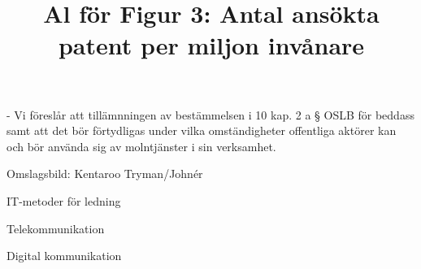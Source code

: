 - Vi föreslår att tillämnningen av bestämmelsen i 10 kap. 2 a § OSLB för beddass samt att det bör förtydligas under vilka omständigheter offentliga aktörer kan och bör använda sig av molntjänster i sin verksamhet. \({ }^{}\)

\title{
Al för
}

Omslagsbild: Kentaroo Tryman/Johnér

\title{
Figur 3: Antal ansökta patent per miljon invånare
}
IT-metoder för ledning

Telekommunikation

Digital kommunikation

